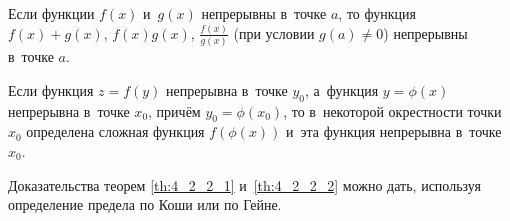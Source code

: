 
\begin{Th}\label{th:4_2_2_1}
Если функции $f(x)$ и~$g(x)$ непрерывны в~точке $a$, то функция $f(x) + g(x)$, 
$f(x)g(x)$, $\displaystyle \frac{f(x)}{g(x)}$ (при условии $g(a) \ne 0$)
непрерывны в~точке $a$.
\end{Th}

\begin{Th}\label{th:4_2_2_2}
Если функция $z = f(y)$ непрерывна в~точке $y_{0}$, а~функция $y = \phi(x)$
непрерывна в~точке $x_{0}$, причём $y_{0} = \phi(x_{0})$,
то в~некоторой окрестности точки $x_{0}$ определена сложная функция $f(\phi(x))$
и~эта функция непрерывна в~точке $x_{0}$.
\end{Th}

Доказательства теорем \ref{th:4_2_2_1} и~\ref{th:4_2_2_2} можно дать, используя
определение предела по Коши или по Гейне.

